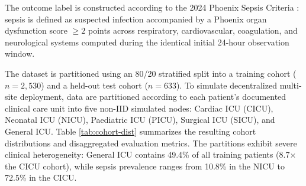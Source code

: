 \documentclass[conference,a4paper]{IEEEtran}
\begin{document}
The outcome label is constructed according to the 2024 Phoenix Sepsis Criteria \cite{schlapbach2024phoenix,sanchezpinto2024phoenix}: sepsis is defined as suspected infection accompanied by a Phoenix organ dysfunction score $\ge 2$ points across respiratory, cardiovascular, coagulation, and neurological systems computed during the identical initial 24-hour observation window.

The dataset is partitioned using an 80/20 stratified split into a training cohort ($n = 2{,}530$) and a held-out test cohort ($n = 633$). To simulate decentralized multi-site deployment, data are partitioned according to each patient's documented clinical care unit into five non-IID simulated nodes: Cardiac ICU (CICU), Neonatal ICU (NICU), Paediatric ICU (PICU), Surgical ICU (SICU), and General ICU. Table \ref{tab:cohort-dist} summarizes the resulting cohort distributions and disaggregated evaluation metrics. The partitions exhibit severe clinical heterogeneity: General ICU contains 49.4\% of all training patients (8.7$\times$ the CICU cohort), while sepsis prevalence ranges from 10.8\% in the NICU to 72.5\% in the CICU.
\end{document}
